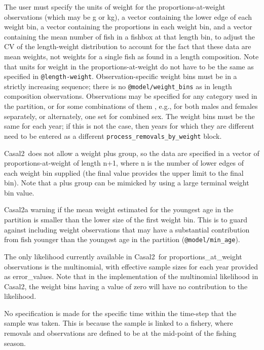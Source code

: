 \documentclass[a4paper,11pt,twoside,pdftex,draft]{article}
\newcommand{\CNAME}{Casal2}
\begin{document}
The user must specify the units of weight for the proportions-at-weight observations (which may be g or kg), a vector containing the lower edge of each weight bin, a vector containing the proportions in each weight bin, and a vector containing the mean number of fish in a fishbox at that length bin, to adjust the CV of the length-weight distribution to account for the fact that these data are mean weights, not weights for a single fish as found in a length composition. Note that units for weight in the proportions-at-weight do not have to be the same as specified in \texttt{@length-weight}. Observation-specific weight bins must be in a strictly increasing sequence; there is no \texttt{@model/weight\_bins} as in length composition observations. Observations may be specified for any category used in the partition, or for some combinations of them , e.g., for both males and females separately, or alternately, one set for combined sex. The weight bins must be the same for each year; if this is not the case, then years for which they are different need to be entered as a different \texttt{process\_removals\_by\_weight} block.

\CNAME\ does not allow a weight plus group, so the data are specified in a vector of proportions-at-weight of length n+1, where n is the number of lower edges of each weight bin supplied (the final value provides the upper limit to the final bin). Note that a plus group can be mimicked by using a large terminal weight bin value.

\CNAME \generates a warning if the mean weight estimated for the youngest age in the partition is smaller than the lower size of the first weight bin. This is to guard against including weight observations that may have a substantial contribution from fish younger than the youngest age in the partition (\texttt{@model/min\_age}).

The only likelihood currently available in \CNAME~for proportions\_at\_weight observations is the multinomial, with effective sample sizes for each year provided as error\_values. Note that in the implementation of the multinomial likelihood in \CNAME, the weight bins having a value of zero will have no contribution to the likelihood.

No specification is made for the specific time within the time-step that the sample was taken. This is because the sample is linked to a fishery, where removals and observations are defined to be at the mid-point of the fishing season.
\end{document}
